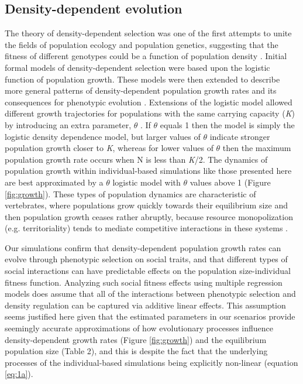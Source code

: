 \documentclass{article}
\begin{document}
\subsection{Density-dependent evolution}
The theory of density-dependent selection was one of the first attempts to unite the fields of population ecology and population genetics, suggesting that the fitness of different genotypes could be a function of population density \citep{macarthur1967theory}. Initial formal models of density-dependent selection \citep{Anderson1971, Charlesworth1971} were based upon the logistic function of population growth. These models were then extended to describe more general patterns of density-dependent population growth rates \citep{Gilpin1973a} and its consequences for phenotypic evolution \citep{Gilpin1976}. Extensions of the logistic model allowed different growth trajectories for populations with the same carrying capacity (\textit{K}) by introducing an extra parameter, $\theta$ \citep{Lande2003}. If $\theta$ equals 1 then the model is simply the logistic density dependence model, but larger values of $\theta$ indicate stronger population growth closer to \textit{K}, whereas for lower values of $\theta$ then the maximum population growth rate occurs when N is less than \textit{K}/2. The dynamics of population growth within individual-based simulations like those presented here are best approximated by a $\theta$ logistic model with $\theta$ values above 1 (Figure \ref{fig:growth}). These types of population dynamics are characteristic of vertebrates, where populations grow quickly towards their equilibrium size and then population growth ceases rather abruptly, because resource monopolization (e.g. territoriality) tends to mediate competitive interactions in these systems \citep{Gilpin1973a}. 

Our simulations confirm that density-dependent population growth rates can evolve through phenotypic selection on social traits, and that different types of social interactions can have predictable effects on the population size-individual fitness function. Analyzing such social fitness effects using multiple regression models does assume that all of the interactions between phenotypic selection and density regulation can be captured via additive linear effects. This assumption seems justified here given that the estimated parameters in our scenarios provide seemingly accurate approximations of how evolutionary processes influence density-dependent growth rates (Figure \ref{fig:growth}) and the equilibrium population size (Table 2), and this is despite the fact that the underlying processes of the individual-based simulations being explicitly non-linear (equation \ref{eq:1a}). 
\end{document}
